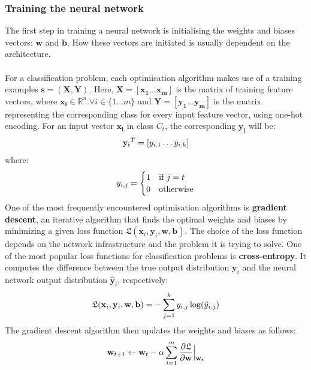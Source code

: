 	\subsubsection{Training the neural network} \label{Section 2.2.2.3}
	The first step in training a neural network is initialising the weights and biases vectors: $\mathbf{w}$ and $\mathbf{b}$. How these vectors are initiated is usually dependent on the architecture. 
	\\ \\
	For a classification problem, each optimisation algorithm makes use of a training examples $\mathbf{s}=(\mathbf{X}, \mathbf{Y})$. Here, $\mathbf{X} = [\mathbf{x_1}\dots\mathbf{x_m}]$ is the matrix of training feature vectors, where $\mathbf{x_i}\in\mathbb{R}^n. \forall i \in \{1\dots m\}$ and $\mathbf{Y} = [\mathbf{y_1}\dots\mathbf{y_m}]$ is the matrix representing the corresponding class for every input feature vector, using one-hot encoding. For an input vector $\mathbf{x_i}$ in class $C_t$, the corresponding $\mathbf{y_i}$ will be:
	\begin{equation}
		\centering
		\mathbf{y_i}^T = [y_{i, 1}\dots y_{i, k}]
	\end{equation} 
	where:
	\begin{equation}
		\centering
		y_{i, j} = 
		\begin{cases}
			1 & \text{if } j = t \\
			0 & \text{otherwise}
		\end{cases}
	\end{equation}
	One of the most frequently encountered optimisation algorithms is \textbf{gradient descent}, an iterative algorithm that finds the optimal weights and biases by minimizing a given loss function $\mathfrak{L}(\mathbf{x}_i, \mathbf{y}_i, \mathbf{w}, \mathbf{b})$. The choice of the loss function depends on the network infrastructure and the problem it is trying to solve. One of the most popular loss functions for classification problems is \textbf{cross-entropy}. It computes the difference between the true output distribution $\mathbf{y}_i$ and the neural network output distribution $\mathbf{\hat{y}}_i$, respectively:
	\begin{equation}
		\centering
		\mathfrak{L}(\mathbf{x}_i, \mathbf{y}_i, \mathbf{w}, \mathbf{b}) = -\sum_{j=1}^{k}y_{i,j}\log(\hat{y}_{i,j})
	\end{equation}
	The gradient descent algorithm then updates the weights and biases as follows: 
	\begin{equation}
		\centering
		\mathbf{w}_{t+1} \leftarrow \mathbf{w}_t - \alpha \sum_{i=1}^{m}\frac{\partial \mathfrak{L}}{\partial \mathbf{w}}\Bigr|_{\substack{\mathbf{w}_t}}
		\label{Eq 2.13}
 	\end{equation}
